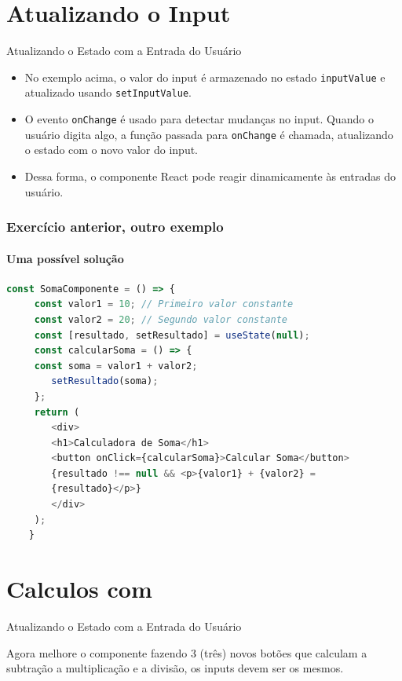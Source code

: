 \documentclass[13pt, xcolor={dvipsnames,svgnames}, portuguese]{beamer}
\begin{document}
\section{Atualizando o Input}

\begin{frame}{Atualizando o Estado com a Entrada do Usuário}
\begin{itemize}
    \item No exemplo acima, o valor do input é armazenado no estado \texttt{inputValue} e atualizado usando \texttt{setInputValue}.
    \item O evento \texttt{onChange} é usado para detectar mudanças no input. Quando o usuário digita algo, a função passada para \texttt{onChange} é chamada, atualizando o estado com o novo valor do input.
    \item Dessa forma, o componente React pode reagir dinamicamente às entradas do usuário.
\end{itemize}
\end{frame}

\begin{frame}[fragile]
\frametitle{Exercício anterior, outro exemplo}
\framesubtitle{Uma possível solução}
 \begin{lstlisting}[language=JavaScript]
    const SomaComponente = () => {
	 const valor1 = 10; // Primeiro valor constante
	 const valor2 = 20; // Segundo valor constante
	 const [resultado, setResultado] = useState(null);
	 const calcularSoma = () => {
	 const soma = valor1 + valor2;
		setResultado(soma);
	 };
	 return (
		<div>
		<h1>Calculadora de Soma</h1>
		<button onClick={calcularSoma}>Calcular Soma</button>
		{resultado !== null && <p>{valor1} + {valor2} =
		{resultado}</p>}
	 	</div>
	 );
	}
    \end{lstlisting}

\end{frame}


\section{Calculos com }
\begin{frame}{Atualizando o Estado com a Entrada do Usuário}

Agora melhore o componente fazendo 3 (três) novos botões que calculam a subtração a multiplicação e a divisão, os inputs devem ser os mesmos.
\end{frame}
\end{document}
